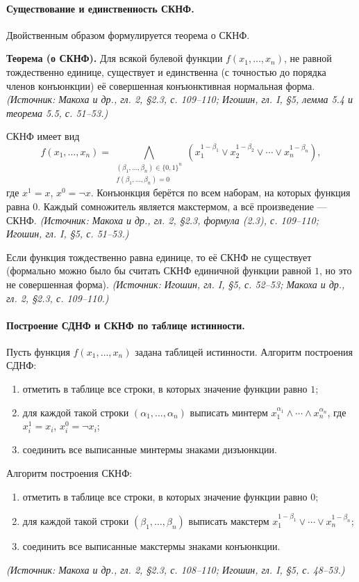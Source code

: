\documentclass[a4paper,12pt]{article}
\begin{document}
\paragraph{Существование и единственность СКНФ.}
Двойственным образом формулируется теорема о СКНФ.

\textbf{Теорема (о СКНФ).} Для всякой булевой функции \(f(x_1,\ldots,x_n)\), не равной тождественно единице, существует и единственна (с точностью до порядка членов конъюнкции) её совершенная конъюнктивная нормальная форма.
\textit{(Источник: Макоха и др., гл. 2, §2.3, с. 109--110; Игошин, гл. I, §5, лемма 5.4 и теорема 5.5, с. 51--53.)}

СКНФ имеет вид
\[
f(x_1,\ldots,x_n)
=
\bigwedge_{\substack{(\beta_1,\ldots,\beta_n)\in\{0,1\}^n\\ f(\beta_1,\ldots,\beta_n)=0}}
\left(x_1^{1-\beta_1}\lor x_2^{1-\beta_2}\lor\cdots\lor x_n^{1-\beta_n}\right),
\tag{2.3}
\]
где \(x^1=x\), \(x^0=\neg x\). Конъюнкция берётся по всем наборам, на которых функция равна \(0\). Каждый сомножитель является макстермом, а всё произведение — СКНФ.
\textit{(Источник: Макоха и др., гл. 2, §2.3, формула (2.3), с. 109--110; Игошин, гл. I, §5, с. 51--53.)}

Если функция тождественно равна единице, то её СКНФ не существует (формально можно было бы считать СКНФ единичной функции равной \(1\), но это не совершенная форма).
\textit{(Источник: Игошин, гл. I, §5, с. 52--53; Макоха и др., гл. 2, §2.3, с. 109--110.)}

\paragraph{Построение СДНФ и СКНФ по таблице истинности.}
Пусть функция \(f(x_1,\ldots,x_n)\) задана таблицей истинности. Алгоритм построения СДНФ:
\begin{enumerate}[label=\arabic*)]
\item отметить в таблице все строки, в которых значение функции равно \(1\);
\item для каждой такой строки \((\alpha_1,\ldots,\alpha_n)\) выписать минтерм \(x_1^{\alpha_1}\land\cdots\land x_n^{\alpha_n}\), где \(x_i^1=x_i\), \(x_i^0=\neg x_i\);
\item соединить все выписанные минтермы знаками дизъюнкции.
\end{enumerate}
Алгоритм построения СКНФ:
\begin{enumerate}[label=\arabic*)]
\item отметить в таблице все строки, в которых значение функции равно \(0\);
\item для каждой такой строки \((\beta_1,\ldots,\beta_n)\) выписать макстерм \(x_1^{1-\beta_1}\lor\cdots\lor x_n^{1-\beta_n}\);
\item соединить все выписанные макстермы знаками конъюнкции.
\end{enumerate}
\textit{(Источник: Макоха и др., гл. 2, §2.3, с. 108--110; Игошин, гл. I, §5, с. 48--53.)}
\end{document}
